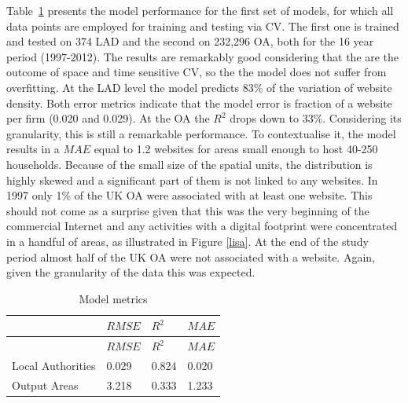 \documentclass[
  authoryear,
  preprint,
  3p]{elsarticle}
\begin{document}
Table~\ref{tbl-model-metrics} presents the model performance for the
first set of models, for which all data points are employed for training
and testing via CV. The first one is trained and tested on 374 LAD and
the second on 232,296 OA, both for the 16 year period (1997-2012). The
results are remarkably good considering that the are the outcome of
space and time sensitive CV, so the the model does not suffer from
overfitting. At the LAD level the model predicts 83\% of the variation
of website density. Both error metrics indicate that the model error is
fraction of a website per firm (0.020 and 0.029). At the OA the \(R^2\)
drops down to 33\%. Considering its granularity, this is still a
remarkable performance. To contextualise it, the model results in a
\(MAE\) equal to 1.2 websites for areas small enough to host 40-250
households. Because of the small size of the spatial units, the
distribution is highly skewed and a significant part of them is not
linked to any websites. In 1997 only 1\% of the UK OA were associated
with at least one website. This should not come as a surprise given that
this was the very beginning of the commercial Internet and any
activities with a digital footprint were concentrated in a handful of
areas, as illustrated in Figure \ref{lisa}. At the end of the study
period almost half of the UK OA were not associated with a website.
Again, given the granularity of the data this was expected.

\begin{longtable}[]{@{}llll@{}}
\caption{Model metrics}\label{tbl-model-metrics}\tabularnewline
\toprule\noalign{}
& \(RMSE\) & \(R^{2}\) & \(MAE\) \\
\midrule\noalign{}
\endfirsthead
\toprule\noalign{}
& \(RMSE\) & \(R^{2}\) & \(MAE\) \\
\midrule\noalign{}
\endhead
\bottomrule\noalign{}
\endlastfoot
Local Authorities & 0.029 & 0.824 & 0.020 \\
Output Areas & 3.218 & 0.333 & 1.233 \\
\end{longtable}
\end{document}
